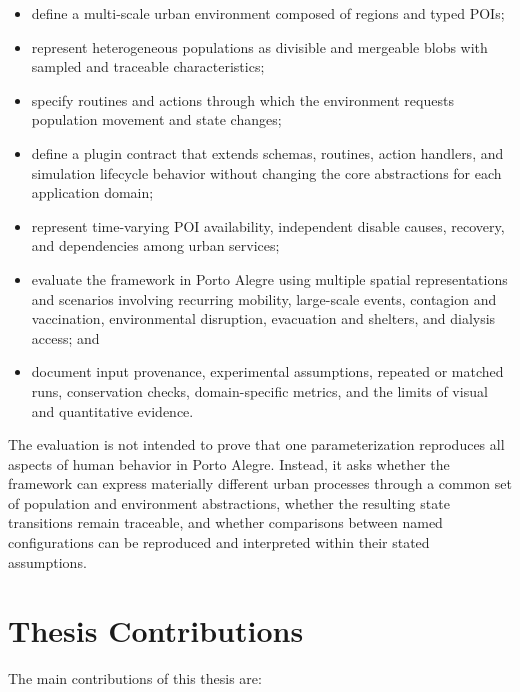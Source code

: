 \begin{itemize}
    \item define a multi-scale urban environment composed of regions and typed POIs;
    \item represent heterogeneous populations as divisible and mergeable blobs with sampled and traceable characteristics;
    \item specify routines and actions through which the environment requests population movement and state changes;
    \item define a plugin contract that extends schemas, routines, action handlers, and simulation lifecycle behavior without changing the core abstractions for each application domain;
    \item represent time-varying POI availability, independent disable causes, recovery, and dependencies among urban services;
    \item evaluate the framework in Porto Alegre using multiple spatial representations and scenarios involving recurring mobility, large-scale events, contagion and vaccination, environmental disruption, evacuation and shelters, and dialysis access; and
    \item document input provenance, experimental assumptions, repeated or matched runs, conservation checks, domain-specific metrics, and the limits of visual and quantitative evidence.
\end{itemize}

The evaluation is not intended to prove that one parameterization reproduces all aspects of human behavior in Porto Alegre. Instead, it asks whether the framework can express materially different urban processes through a common set of population and environment abstractions, whether the resulting state transitions remain traceable, and whether comparisons between named configurations can be reproduced and interpreted within their stated assumptions.

\section{Thesis Contributions}
\label{sec:introduction_contributions}

The main contributions of this thesis are:

